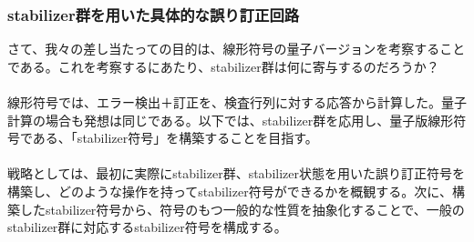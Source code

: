 \documentclass[a4paper,10.5pt]{article}
\numberwithin{equation}{section}
\begin{document}
\subsubsection{stabilizer群を用いた具体的な誤り訂正回路}
さて、我々の差し当たっての目的は、線形符号の量子バージョンを考察することである。これを考察するにあたり、stabilizer群は何に寄与するのだろうか？\\
\\
線形符号では、エラー検出＋訂正を、検査行列に対する応答から計算した。量子計算の場合も発想は同じである。以下では、stabilizer群を応用し、量子版線形符号である、「stabilizer符号」を構築することを目指す。\\
\\
戦略としては、最初に実際にstabilizer群、stabilizer状態を用いた誤り訂正符号を構築し、どのような操作を持ってstabilizer符号ができるかを概観する。次に、構築したstabilizer符号から、符号のもつ一般的な性質を抽象化することで、一般のstabilizer群に対応するstabilizer符号を構成する。
\end{document}
